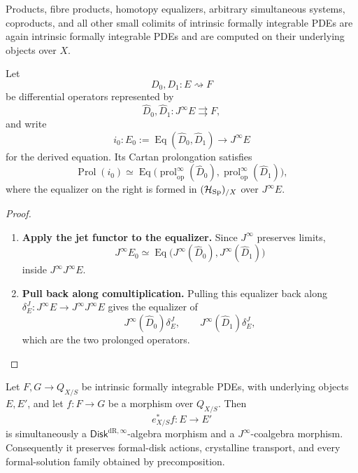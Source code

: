 \begin{corollary}
Products, fibre products, homotopy equalizers, arbitrary simultaneous systems,
coproducts, and all other small colimits of intrinsic formally integrable PDEs
are again intrinsic formally integrable PDEs and are computed on their
underlying objects over \(X\).
\end{corollary}

\begin{corollary}
Let
\[
  D_0,D_1:E\rightsquigarrow F
\]
be differential operators represented by
\[
  \widehat D_0,\widehat D_1:J^\infty E\rightrightarrows F,
\]
and write
\[
  i_0:
  E_0:=\operatorname{Eq}(\widehat D_0,\widehat D_1)
  \longrightarrow
  J^\infty E
\]
for the derived equation. Its Cartan prolongation satisfies
\[
  \operatorname{Prol}(i_0)
  \simeq
  \operatorname{Eq}
  \bigl(\operatorname{prol}_{\mathrm{op}}^\infty(\widehat D_0),\operatorname{prol}_{\mathrm{op}}^\infty(\widehat D_1)\bigr),
\]
where the equalizer on the right is formed in \((\mathcal H_{\operatorname{Sp}})_{/X}\) over
\(J^\infty E\).
\end{corollary}

\begin{proof}
\leavevmode
\begin{enumerate}[label=\textup{(\arabic*)}]
    \item \textbf{Apply the jet functor to the equalizer.}
Since \(J^\infty\) preserves limits,
\[
  J^\infty E_0
  \simeq
  \operatorname{Eq}
  \bigl(J^\infty(\widehat D_0),J^\infty(\widehat D_1)\bigr)
\]
inside \(J^\infty J^\infty E\).

    \item \textbf{Pull back along comultiplication.}
Pulling this equalizer back along
\(\delta^J_E:J^\infty E\to J^\infty J^\infty E\) gives the equalizer of
\[
  J^\infty(\widehat D_0)\delta^J_E,
  \qquad
  J^\infty(\widehat D_1)\delta^J_E,
\]
which are the two prolonged operators.
\end{enumerate}
\end{proof}

\begin{proposition}
Let \(F,G\to Q_{X/S}\) be intrinsic formally integrable PDEs, with underlying objects \(E,E'\), and let
\(f:F\to G\) be a morphism over \(Q_{X/S}\). Then
\[
  e_{X/S}^*f:E\to E'
\]
is simultaneously a \(\mathsf{Disk}^{\mathrm{dR},\infty}\)-algebra morphism and a
\(J^\infty\)-coalgebra morphism. Consequently it preserves formal-disk
actions, crystalline transport, and every formal-solution family obtained by
precomposition.
\end{proposition}


